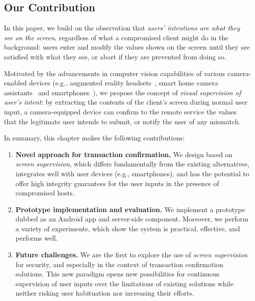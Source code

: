 \subsection{Our Contribution} In this paper, we build on the observation that \textit{users' intentions are what they see on the screen}, regardless of what a compromised client might do in the background: users enter and modify the values shown on the screen until they are satisfied with what they see, or abort if they are prevented from doing so.

Motivated by the advancements in computer vision capabilities of various camera-enabled devices (e.g., augmented reality headsets~\cite{TimCookAR, HoloLens2}, smart home camera assistants~\cite{fleck2008smart, lenovoSmartHome} and smartphones~\cite{wald2018real, smartphonesCV}), we propose the concept of \emph{visual supervision of user's intent}: by extracting the contents of the client's screen during normal user input, a camera-equipped device can confirm to the remote service the values that the legitimate user intends to submit, or notify the user of any mismatch.


In summary, this chapter makes the following contributions:

\begin{enumerate}

\item \textbf{Novel approach for transaction confirmation.} We design \sysname based on \emph{screen supervision}, which differs fundamentally from the existing alternatives, integrates well with user devices (e.g., smartphones), and has the potential to offer high integrity guarantees for the user inputs in the presence of compromised hosts.

\item \textbf{Prototype implementation and evaluation.} We implement a prototype dubbed \sysname as an Android app and server-side component. Moreover, we perform a variety of experiments, which show the system is practical, effective, and performs well. 

\item \textbf{Future challenges.} We are the first to explore the use of \emph{screen supervision} for security, and especially in the context of transaction confirmation solutions. This new paradigm opens new possibilities for continuous supervision of user inputs over the limitations of existing solutions while neither risking user habituation nor increasing their efforts.


\end{enumerate}

